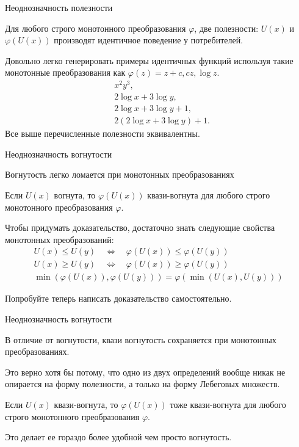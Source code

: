 \documentclass{beamer}
\begin{document}
\begin{frame}{Неоднозначность полезности}

Для любого строго монотонного преобразования $\varphi$, две полезности: $U(x)$ и $\varphi(U(x))$ производят идентичное поведение у потребителей.  

Довольно легко генерировать примеры идентичных функций используя такие монотонные преобразования как $\varphi(z) = z + c, cz , \log z$.
\begin{align*}
& x^2y^3,\\
& 2\log x + 3\log y,\\
& 2\log x + 3\log y + 1,\\
& 2(2\log x + 3\log y) + 1.
\end{align*}
Все выше перечисленные полезности эквивалентны.
\end{frame}

\begin{frame}{Неоднозначность вогнутости}

Вогнутость легко ломается при монотонных преобразованиях

\begin{lemma}
Если $U(x)$ вогнута, то $\varphi(U(x))$ квази-вогнута для любого строго монотонного преобразования $\varphi$. 
\end{lemma}

Чтобы придумать доказательство, достаточно знать следующие свойства монотонных преобразований:
 \begin{align*}
U(x) \leqslant U(y) \quad \Leftrightarrow \quad \varphi(U(x)) \leqslant \varphi(U(y))\\
U(x) \geqslant U(y) \quad \Leftrightarrow \quad \varphi(U(x)) \geqslant \varphi(U(y))\\
\min(\varphi(U(x)), \varphi(U(y))) = \varphi(\min(U(x),U(y)))
\end{align*}

Попробуйте теперь написать доказательство самостоятельно.

\end{frame}

\begin{frame}{Неоднозначность вогнутости}

В отличие от вогнутости, квази вогнутость сохраняется при монотонных преобразованиях.

Это верно хотя бы потому, что одно из двух определений вообще никак не опирается на форму полезности, а только на форму Лебеговых множеств.

\begin{lemma}
Если $U(x)$ квази-вогнута, то $\varphi(U(x))$ тоже квази-вогнута для любого строго монотонного преобразования $\varphi$. 
\end{lemma}

Это делает ее гораздо более удобной чем просто вогнутость.

\end{frame}
\end{document}
